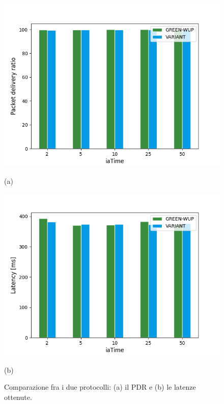 \documentclass{report}
\begin{document}
\begin{figure}
    \centering
    \begin{minipage}{.5\textwidth}
      \centering
      \includegraphics[width=1\linewidth]{pdr_plot.png}
      \caption*{(a)}
    \end{minipage}%
    \begin{minipage}{.5\textwidth}
      \centering
      \includegraphics[width=1\linewidth]{latency_plot.png}
      \caption*{(b)}
    \end{minipage}
    \caption{Comparazione fra i due protocolli: (a) il PDR e (b) le latenze ottenute. }
    \end{figure}
\end{document}

